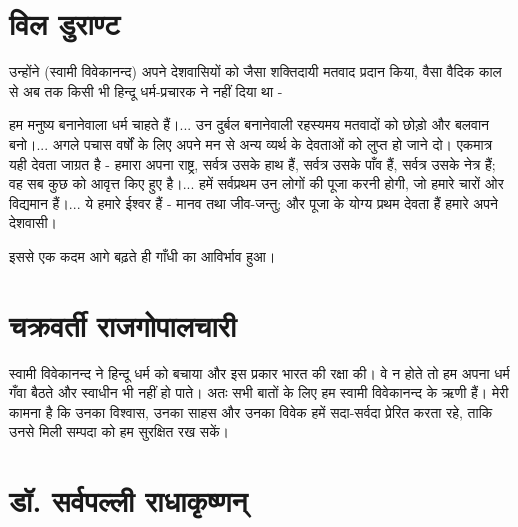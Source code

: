 \section*{विल डुराण्ट}


उन्होंने (स्वामी विवेकानन्द) अपने देशवासियों को जैसा शक्तिदायी मतवाद प्रदान किया, वैसा वैदिक काल से अब तक किसी भी हिन्दू धर्म-प्रचारक ने नहीं दिया था - 

हम मनुष्य बनानेवाला धर्म चाहते हैं।... उन दुर्बल बनानेवाली रहस्यमय मतवादों को छोड़ो और बलवान बनो।... अगले पचास वर्षों के लिए अपने मन से अन्य व्यर्थ के देवताओं को लुप्त हो जाने दो। एकमात्र यही देवता जाग्रत है - हमारा अपना राष्ट्र, सर्वत्र उसके हाथ हैं, सर्वत्र उसके पाँव हैं, सर्वत्र उसके नेत्र हैं; वह सब कुछ को आवृत्त किए हुए है।... हमें सर्वप्रथम उन लोगों की पूजा करनी होगी, जो हमारे चारों ओर विद्यमान हैं।... ये हमारे ईश्वर हैं - मानव तथा जीव-जन्तु; और पूजा के योग्य प्रथम देवता हैं हमारे अपने देशवासी। 

इससे एक कदम आगे बढ़ते ही गाँधी का आविर्भाव हुआ।


\section*{चक्रवर्ती राजगोपालचारी}


स्वामी विवेकानन्द ने हिन्दू धर्म को बचाया और इस प्रकार भारत की रक्षा की। वे न होते तो हम अपना धर्म गँवा बैठते और स्वाधीन भी नहीं हो पाते। अतः सभी बातों के लिए हम स्वामी विवेकानन्द के ऋणी हैं। मेरी कामना है कि उनका विश्वास, उनका साहस और उनका विवेक हमें सदा-सर्वदा प्रेरित करता रहे, ताकि उनसे मिली सम्पदा को हम सुरक्षित रख सकें।


\section*{डॉ. सर्वपल्ली राधाकृष्णन्}


